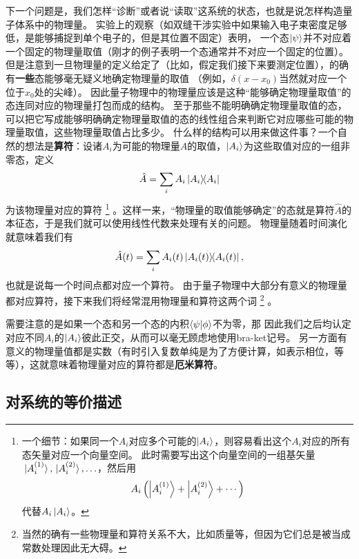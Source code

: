 \documentclass[UTF8, a4paper]{ctexart}
\begin{document}
下一个问题是，我们怎样“诊断”或者说“读取”这系统的状态，也就是说怎样构造量子体系中的物理量。
实验上的观察（如双缝干涉实验中如果输入电子束密度足够低，是能够捕捉到单个电子的，但是其位置不固定）表明，
一个态$\ket{\psi}$并不对应着一个固定的物理量取值（刚才的例子表明一个态通常并不对应一个固定的位置）。
但是注意到一旦物理量的定义给定了（比如，假定我们接下来要测定位置），的确有\textbf{一些}态能够毫无疑义地确定物理量的取值
（例如，$\delta(x-x_0)$当然就对应一个位于$x_0$处的尖峰）。
因此量子物理中的物理量应该是这种“能够确定物理量取值”的态连同对应的物理量打包而成的结构。
至于那些不能明确确定物理量取值的态，可以把它写成能够明确确定物理量取值的态的线性组合来判断它对应哪些可能的物理量取值，这些物理量取值占比多少。
什么样的结构可以用来做这件事？一个自然的想法是\textbf{算符}：设诸$A_i$为可能的物理量$A$的取值，$\ket{A_i}$为这些取值对应的一组非零态，定义
\begin{equation}
    \hat{A} = \sum_i A_i \dyad{A_i}
\end{equation}
为该物理量对应的算符%
\footnote{一个细节：如果同一个$A_i$对应多个可能的$\ket{A_i}$，则容易看出这个$A_i$对应的所有态矢量对应一个向量空间。
此时需要写出这个向量空间的一组基矢量$\ket*{A_i^{(1)}}, \ket*{A_i^{(2)}}, \ldots$，然后用
\[
    A_i \left(\ket{A_i^{(1)}} + \ket{A_i^{(2)}} + \cdots\right)
\]
代替$A_i \ket{A_i}$。}
。这样一来，“物理量的取值能够确定”的态就是算符$\hat{A}$的本征态，于是我们就可以使用线性代数来处理有关的问题。
物理量随着时间演化就意味着我们有
\begin{equation}
    \hat{A}(t) = \sum_i A_i(t) \dyad{A_i(t)},
\end{equation}
也就是说每一个时间点都对应一个算符。
由于量子物理中大部分有意义的物理量都对应算符，接下来我们将经常混用物理量和算符这两个词%
\footnote{当然的确有一些物理量和算符关系不大，比如质量等，但因为它们总是被当成常数处理因此无大碍。}
。

需要注意的是如果一个态和另一个态的内积$\braket{\psi}{\phi}$不为零，那
因此我们之后均认定对应不同$A_i$的$\ket{A_i}$彼此正交，从而可以毫无顾虑地使用bra-ket记号。
另一方面有意义的物理量值都是实数（有时引入复数单纯是为了方便计算，如表示相位，等等），这就意味着物理量对应的算符都是\textbf{厄米算符}。

\subsection{对系统的等价描述}
\end{document}
